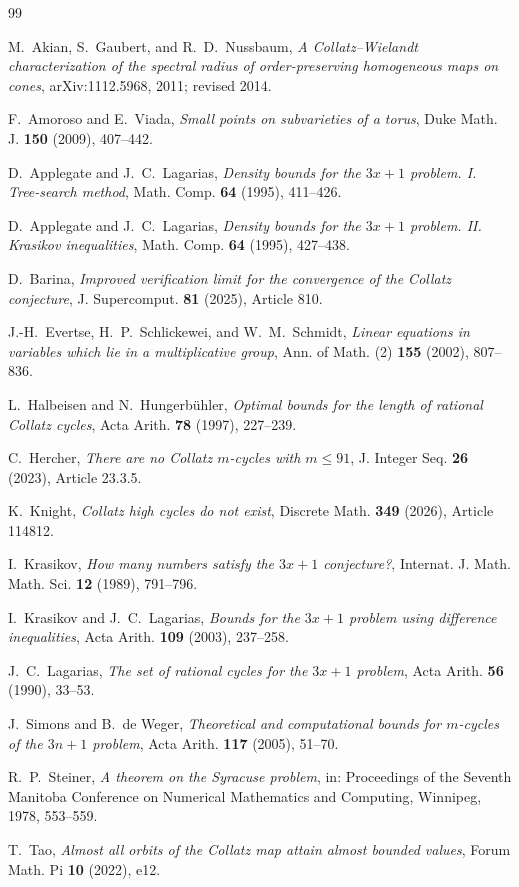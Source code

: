 \documentclass[11pt]{amsart}
\numberwithin{equation}{section}
\begin{document}
\enlargethispage{2\baselineskip}
\begingroup\footnotesize
\begin{thebibliography}{99}

M.~Akian, S.~Gaubert, and R.~D.~Nussbaum,
\emph{A Collatz--Wielandt characterization of the spectral radius of order-preserving homogeneous maps on cones},
arXiv:1112.5968, 2011; revised 2014.

F.~Amoroso and E.~Viada,
\emph{Small points on subvarieties of a torus},
Duke Math. J. \textbf{150} (2009), 407--442.

D.~Applegate and J.~C.~Lagarias,
\emph{Density bounds for the $3x+1$ problem. I. Tree-search method},
Math. Comp. \textbf{64} (1995), 411--426.

D.~Applegate and J.~C.~Lagarias,
\emph{Density bounds for the $3x+1$ problem. II. Krasikov inequalities},
Math. Comp. \textbf{64} (1995), 427--438.

D.~Barina,
\emph{Improved verification limit for the convergence of the Collatz conjecture},
J. Supercomput. \textbf{81} (2025), Article 810.

J.-H.~Evertse, H.~P.~Schlickewei, and W.~M.~Schmidt,
\emph{Linear equations in variables which lie in a multiplicative group},
Ann. of Math. (2) \textbf{155} (2002), 807--836.

L.~Halbeisen and N.~Hungerb\"uhler,
\emph{Optimal bounds for the length of rational Collatz cycles},
Acta Arith. \textbf{78} (1997), 227--239.

C.~Hercher,
\emph{There are no Collatz $m$-cycles with $m\le91$},
J. Integer Seq. \textbf{26} (2023), Article 23.3.5.

K.~Knight,
\emph{Collatz high cycles do not exist},
Discrete Math. \textbf{349} (2026), Article 114812.

I.~Krasikov,
\emph{How many numbers satisfy the $3x+1$ conjecture?},
Internat. J. Math. Math. Sci. \textbf{12} (1989), 791--796.

I.~Krasikov and J.~C.~Lagarias,
\emph{Bounds for the $3x+1$ problem using difference inequalities},
Acta Arith. \textbf{109} (2003), 237--258.

J.~C.~Lagarias,
\emph{The set of rational cycles for the $3x+1$ problem},
Acta Arith. \textbf{56} (1990), 33--53.

J.~Simons and B.~de Weger,
\emph{Theoretical and computational bounds for $m$-cycles of the $3n+1$ problem},
Acta Arith. \textbf{117} (2005), 51--70.

R.~P.~Steiner,
\emph{A theorem on the Syracuse problem},
in: Proceedings of the Seventh Manitoba Conference on Numerical Mathematics and Computing, Winnipeg, 1978, 553--559.

T.~Tao,
\emph{Almost all orbits of the Collatz map attain almost bounded values},
Forum Math. Pi \textbf{10} (2022), e12.

\end{thebibliography}
\endgroup
\end{document}
